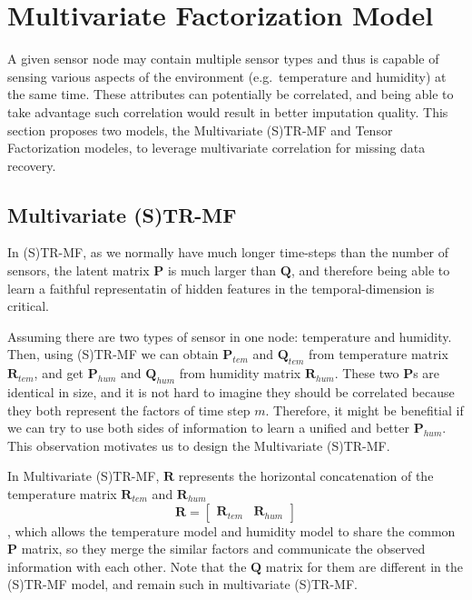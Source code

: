 
\section{Multivariate Factorization Model} \label{sec:tf}
A given sensor node may contain multiple sensor types and thus is capable of sensing various aspects of the environment (e.g.\ temperature and humidity) at the same time.
These attributes can potentially be correlated, and being able to take advantage such correlation would result in better imputation quality.
This section proposes two models, the Multivariate (S)TR-MF and Tensor Factorization modeles, to leverage multivariate correlation for missing data recovery.

\subsection{Multivariate (S)TR-MF} %
In (S)TR-MF, as we normally have much longer time-steps than the number of sensors, the latent matrix $\mathbf{P}$ is much larger than $\mathbf{Q}$, and therefore being able to learn a faithful representatin of hidden features in the temporal-dimension is critical. 

Assuming there are two types of sensor in one node: temperature and humidity. Then, using (S)TR-MF we can obtain $\mathbf{P}_{tem}$ and $\mathbf{Q}_{tem}$ from temperature matrix $\mathbf{R}_{tem}$, and get $\mathbf{P}_{hum}$ and $\mathbf{Q}_{hum}$ from humidity matrix $\mathbf{R}_{hum}$. These two $\mathbf{P}$s are identical in size, and it is not hard to imagine they should be correlated because they both represent the factors of time step $m$. Therefore, it might be benefitial if we can try to use both sides of information to learn a unified and better $\mathbf{P}_{hum}$.
This observation motivates us to design the Multivariate (S)TR-MF.

In Multivariate (S)TR-MF, $\mathbf{R}$ represents the horizontal concatenation of the temperature matrix $\mathbf{R}_{tem}$ and $\mathbf{R}_{hum}$
\begin{equation*} \mathbf{R} = \begin{bmatrix}\mathbf{R}_{tem} & \mathbf{R}_{hum} \end{bmatrix} \end{equation*}
, which allows the temperature model and humidity model to share the common $\mathbf{P}$ matrix, so they merge the similar factors and communicate the observed information with each other. Note that the $\mathbf{Q}$ matrix for them are different in the (S)TR-MF model, and remain such in multivariate (S)TR-MF.

